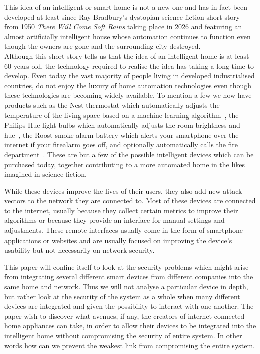 \documentclass[12pt]{article}
\begin{document}
This idea of an intelligent or smart home is not a new one and has in fact been developed at least since Ray Bradbury's dystopian science fiction short story from 1950 \textit{There Will Come Soft Rains} taking place in 2026 and featuring an almost artificially intelligent house whose automation continues to function even though the owners are gone and the surrounding city destroyed. \\
Although this short story tells us that the idea of an intelligent home is at least 60 years old, the technology required to realise the idea has taking a long time to develop. Even today the vast majority of people living in developed industrialised countries, do not enjoy the luxury of home automation technologies even though these technologies are becoming widely available. To mention a few we now have products such as the Nest thermostat which automatically adjusts the temperature of the living space based on a machine learning algorithm~\cite{nest-labs}, the Philips Hue light bulbs which automatically adjusts the room brightness and hue~\cite{philips-hue}, the Roost smoke alarm battery which alerts your smartphone over the internet if your firealarm goes off, and optionally automatically calls the fire department~\cite{roost}. These are but a few of the possible intelligent devices which can be purchased today, together contributing to a more automated home in the likes imagined in science fiction. 

While these devices improve the lives of their users, they also add new attack vectors to the network they are connected to. Most of these devices are connected to the internet, usually because they collect certain metrics to improve their algorithms or because they provide an interface for manual settings and adjustments. These remote interfaces usually come in the form of smartphone applications or websites and are usually focused on improving the device's usability but not necessarily on network security. 

This paper will confine itself to look at the security problems which might arise from integrating several different smart devices from different companies into the same home and network. Thus we will not analyse a particular device in depth, but rather look at the security of the system as a whole when many different devices are integrated and given the possibility to interact with one-another. The paper wish to discover what avenues, if any, the creators of internet-connected home appliances can take, in order to allow their devices to be integrated into the intelligent home without compromising the security of entire system. In other words how can we prevent the weakest link from compromising the entire system.
\end{document}

